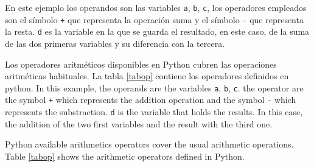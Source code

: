 \begin{paracol}{2}
En este ejemplo los operandos son las variables \texttt{a}, \texttt{b}, \texttt{c}, los operadores empleados son el símbolo \texttt{+} que representa la operación suma y el símbolo \texttt{-}  que representa la resta. \texttt{d} es la variable en la que se guarda el resultado, en este caso, de la suma de las dos primeras variables y su diferencia con la tercera.

Los operadores aritméticos disponibles en Python cubren las operaciones aritméticas habituales. La tabla \ref{tabop} contiene los operadores definidos en  python.
\switchcolumn
In this example, the operands are the variables  \texttt{a}, \texttt{b}, \texttt{c}.  the operator are the symbol \texttt{+} which represents the addition operation and the symbol \texttt{-}  which represents the substraction. \texttt{d} is the variable that holds the results. In this case, the addition of the two first variables and the result with the third one.

Python available arithmetics operators cover the usual arithmetic operations. Table \ref{tabop} shows the arithmetic operators defined in Python.
\end{paracol}


